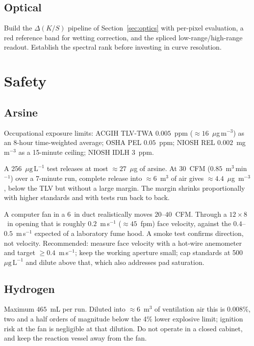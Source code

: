 \documentclass[11pt,a4paper]{article}
\newcommand{\ptl}{\ensuremath{\mu\mathrm{g\,L^{-1}}}}
\begin{document}
\subsection{Optical}

Build the $\Delta(K/S)$ pipeline of Section~\ref{sec:optics} with per-pixel
evaluation, a red reference band for wetting correction, and the spliced
low-range/high-range readout. Establish the spectral rank before investing
in curve resolution.

\section{Safety}

\subsection{Arsine}

Occupational exposure limits: ACGIH TLV-TWA $0.005$~ppm ($\approx
16$~\ensuremath{\mu}g\,m$^{-3}$) as an 8-hour time-weighted average; OSHA
PEL $0.05$~ppm; NIOSH REL $0.002$~mg\,m$^{-3}$ as a 15-minute ceiling;
NIOSH IDLH $3$~ppm.

A 256~\ptl{} test releases at most $\approx 27$~\ensuremath{\mu}g of
arsine. At 30~CFM ($0.85$~m$^3$\,min$^{-1}$) over a 7-minute run, complete
release into $\approx 6$~m$^3$ of air gives $\approx 4.4$~\ensuremath{\mu}g
\,m$^{-3}$, below the TLV but without a large margin. The margin shrinks
proportionally with higher standards and with tests run back to back.

A computer fan in a 6~in duct realistically moves $20$--$40$~CFM. Through a
$12 \times 8$~in opening that is roughly $0.2$~m\,s$^{-1}$ ($\approx
45$~fpm) face velocity, against the $0.4$--$0.5$~m\,s$^{-1}$ expected of a
laboratory fume hood. A smoke test confirms direction, not velocity.
Recommended: measure face velocity with a hot-wire anemometer and target
$\geq 0.4$~m\,s$^{-1}$; keep the working aperture small; cap standards at
500~\ptl{} and dilute above that, which also addresses pad saturation.

\subsection{Hydrogen}

Maximum $465$~mL per run. Diluted into $\approx 6$~m$^3$ of ventilation air
this is $0.008$\%, two and a half orders of magnitude below the 4\% lower
explosive limit; ignition risk at the fan is negligible at that dilution.
Do not operate in a closed cabinet, and keep the reaction vessel away from
the fan.
\end{document}
